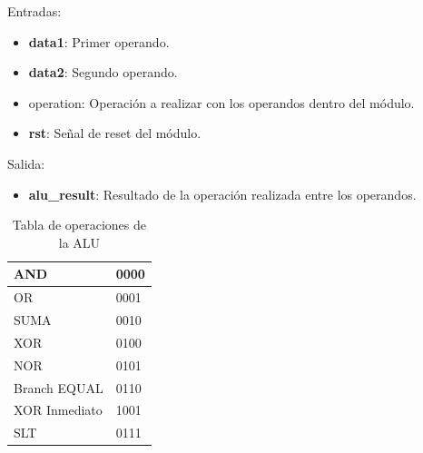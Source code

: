 Entradas:

\begin{itemize}
  \item \textbf{data1}: Primer operando.
  \item \textbf{data2}: Segundo operando.
  \item operation: Operaci\'on a realizar con los operandos dentro del m\'odulo.
  \item \textbf{rst}: Señal de reset del m\'odulo.
\end{itemize}

Salida:

\begin{itemize}
  \item \textbf{alu\_result}: Resultado de la operaci\'on realizada entre los operandos.
\end{itemize}

\begin{center}
\begin{table}[H]
\scriptsize
\centering
\begin{tabular}[\textwidth]{|l|l|}
\hline
AND & 0000\\
\hline
OR & 0001\\
\hline
SUMA & 0010\\
\hline
XOR & 0100\\
\hline
NOR & 0101\\
\hline
Branch EQUAL & 0110\\
\hline
XOR Inmediato & 1001\\
\hline
SLT & 0111\\
\hline
\end{tabular}
\center
\caption{Tabla de operaciones de la ALU}
\label{tab:test1}
\end{table}
\end{center}
